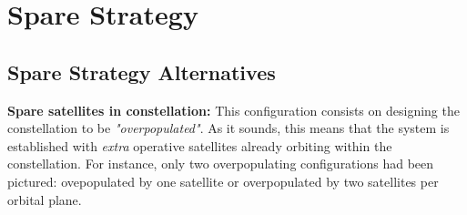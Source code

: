 \section{Spare Strategy}

\subsection{Spare Strategy Alternatives}

\textbf{Spare satellites in constellation:}
\newline
This configuration consists on designing the constellation to be \textit{ "overpopulated"}. As it sounds, this means that the system is established with \textit{extra} operative satellites already orbiting within the constellation. For instance, only two overpopulating configurations had been pictured: ovepopulated by one satellite or overpopulated by two satellites per orbital plane. 

